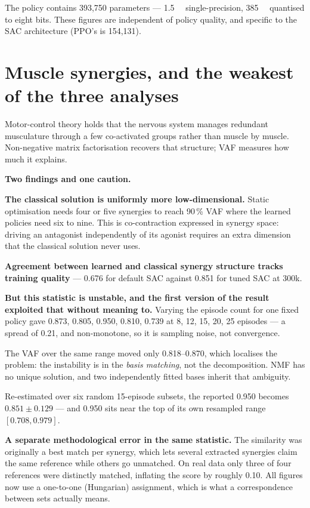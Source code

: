 The policy contains 393{,}750 parameters --- \SI{1.5}{\mega\byte} single-precision,
\SI{385}{\kilo\byte} quantised to eight bits. These figures are independent of
policy quality, and specific to the SAC architecture (PPO's is 154{,}131).

\section{Muscle synergies, and the weakest of the three analyses}

Motor-control theory holds that the nervous system manages redundant musculature
through a few co-activated groups rather than muscle by muscle. Non-negative
matrix factorisation recovers that structure; VAF measures how much it explains.

\textbf{Two findings and one caution.}

\textbf{The classical solution is uniformly more low-dimensional.} Static
optimisation needs four or five synergies to reach 90\,\% VAF where the learned
policies need six to nine. This is co-contraction expressed in synergy space:
driving an antagonist independently of its agonist requires an extra dimension
that the classical solution never uses.

\textbf{Agreement between learned and classical synergy structure tracks training
quality} --- 0.676 for default SAC against 0.851 for tuned SAC at 300k.

\begin{trap}
\textbf{But this statistic is unstable, and the first version of the result
exploited that without meaning to.} Varying the episode count for one fixed
policy gave 0.873, 0.805, 0.950, 0.810, 0.739 at 8, 12, 15, 20, 25 episodes --- a
spread of 0.21, and non-monotone, so it is sampling noise, not convergence.

The VAF over the same range moved only 0.818--0.870, which localises the problem:
the instability is in the \emph{basis matching}, not the decomposition. NMF has no
unique solution, and two independently fitted bases inherit that ambiguity.

Re-estimated over six random 15-episode subsets, the reported 0.950 becomes
$0.851 \pm 0.129$ --- and 0.950 sits near the top of its own resampled range
$[0.708, 0.979]$.

\textbf{A separate methodological error in the same statistic.} The similarity was
originally a best match per synergy, which lets several extracted synergies claim
the same reference while others go unmatched. On real data only three of four
references were distinctly matched, inflating the score by roughly 0.10. All
figures now use a one-to-one (Hungarian) assignment, which is what a
correspondence between sets actually means.
\end{trap}

